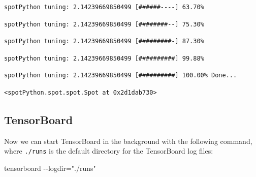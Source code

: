 \documentclass[
  letterpaper,
  DIV=11,
  numbers=noendperiod]{scrreprt}
\newenvironment{Shaded}{\begin{snugshade}}{\end{snugshade}}
\newcommand{\NormalTok}[1]{\textcolor[rgb]{0.00,0.23,0.31}{#1}}
\begin{document}
\begin{verbatim}
spotPython tuning: 2.14239669850499 [######----] 63.70% 
\end{verbatim}

\begin{verbatim}
spotPython tuning: 2.14239669850499 [########--] 75.30% 
\end{verbatim}

\begin{verbatim}
spotPython tuning: 2.14239669850499 [#########-] 87.30% 
\end{verbatim}

\begin{verbatim}
spotPython tuning: 2.14239669850499 [##########] 99.88% 
\end{verbatim}

\begin{verbatim}
spotPython tuning: 2.14239669850499 [##########] 100.00% Done...
\end{verbatim}

\begin{verbatim}
<spotPython.spot.spot.Spot at 0x2d1dab730>
\end{verbatim}

\hypertarget{sec-tensorboard-10}{%
\subsection{TensorBoard}\label{sec-tensorboard-10}}

Now we can start TensorBoard in the background with the following
command, where \texttt{./runs} is the default directory for the
TensorBoard log files:

\begin{Shaded}
\begin{Highlighting}[]
\NormalTok{tensorboard {-}{-}logdir="./runs"}
\end{Highlighting}
\end{Shaded}
\end{document}
